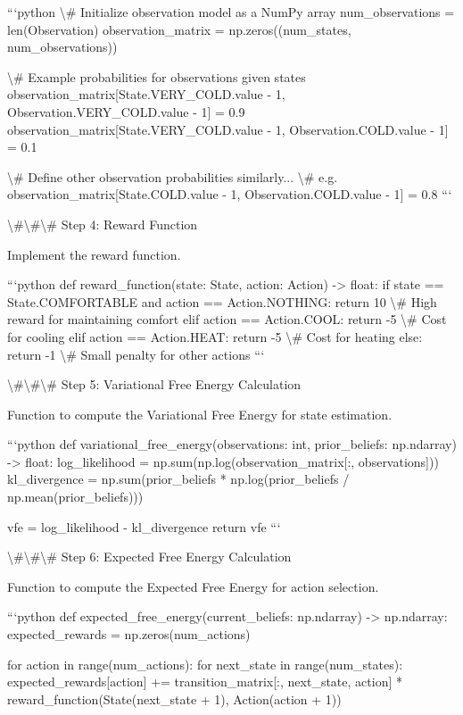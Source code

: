 \documentclass[11pt,a4paper]{article}
\begin{document}
```python
\textbackslash{}# Initialize observation model as a NumPy array
num_observations = len(Observation)
observation_matrix = np.zeros((num_states, num_observations))

\textbackslash{}# Example probabilities for observations given states
observation_matrix[State.VERY_COLD.value - 1, Observation.VERY_COLD.value - 1] = 0.9
observation_matrix[State.VERY_COLD.value - 1, Observation.COLD.value - 1] = 0.1

\textbackslash{}# Define other observation probabilities similarly...
\textbackslash{}# e.g. observation_matrix[State.COLD.value - 1, Observation.COLD.value - 1] = 0.8
```

\textbackslash{}#\textbackslash{}#\textbackslash{}# Step 4: Reward Function

Implement the reward function.

```python
def reward_function(state: State, action: Action) -> float:
    if state == State.COMFORTABLE and action == Action.NOTHING:
        return 10  \textbackslash{}# High reward for maintaining comfort
    elif action == Action.COOL:
        return -5  \textbackslash{}# Cost for cooling
    elif action == Action.HEAT:
        return -5  \textbackslash{}# Cost for heating
    else:
        return -1  \textbackslash{}# Small penalty for other actions
```

\textbackslash{}#\textbackslash{}#\textbackslash{}# Step 5: Variational Free Energy Calculation

Function to compute the Variational Free Energy for state estimation.

```python
def variational_free_energy(observations: int, prior_beliefs: np.ndarray) -> float:
    log_likelihood = np.sum(np.log(observation_matrix[:, observations]))
    kl_divergence = np.sum(prior_beliefs * np.log(prior_beliefs / np.mean(prior_beliefs)))

    vfe = log_likelihood - kl_divergence
    return vfe
```

\textbackslash{}#\textbackslash{}#\textbackslash{}# Step 6: Expected Free Energy Calculation

Function to compute the Expected Free Energy for action selection.

```python
def expected_free_energy(current_beliefs: np.ndarray) -> np.ndarray:
    expected_rewards = np.zeros(num_actions)
    
    for action in range(num_actions):
        for next_state in range(num_states):
            expected_rewards[action] += transition_matrix[:, next_state, action] * reward_function(State(next_state + 1), Action(action + 1))
    
\end{document}
